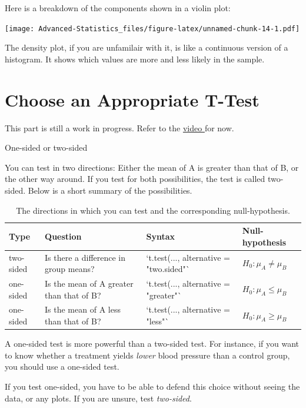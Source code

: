 \documentclass[
]{book}
\begin{document}
Here is a breakdown of the components shown in a violin plot:

\texttt{[image: Advanced-Statistics\_files/figure-latex/unnamed-chunk-14-1.pdf]}

The density plot, if you are unfamilair with it, is like a continuous version of a histogram. It shows which values are more and less likely in the sample.

\hypertarget{choose-an-appropriate-t-test}{%
\section{Choose an Appropriate T-Test}\label{choose-an-appropriate-t-test}}

This part is still a work in progress. Refer to the \href{https://youtu.be/qJA3CvFt_pc}{video } for now.

One-sided or two-sided

You can test in two directions: Either the mean of A is greater than that of B, or the other way around. If you test for both possibilities, the test is called two-sided. Below is a short summary of the possibilities.

\begin{table}

\caption{\label{tab:unnamed-chunk-15}The directions in which you can test and the corresponding null-hypothesis.}
\centering
\fontsize{13}{15}\selectfont
\begin{tabular}[t]{l|l|l|l}
\hline
Type & Question & Syntax & Null-hypothesis\\
\hline
two-sided & Is there a difference in group means? & `t.test(..., alternative = "two.sided"` & $H_0: \mu_A \neq \mu_B$\\
\hline
one-sided & Is the mean of A greater than that of B? & `t.test(..., alternative = "greater"` & $H_0: \mu_A \leq \mu_B$\\
\hline
one-sided & Is the mean of A less than that of B? & `t.test(..., alternative = "less"` & $H_0: \mu_A \geq \mu_B$\\
\hline
\end{tabular}
\end{table}

A one-sided test is more powerful than a two-sided test. For instance, if you want to know whether a treatment yields \emph{lower} blood pressure than a control group, you should use a one-sided test.

If you test one-sided, you have to be able to defend this choice without seeing the data, or any plots. If you are unsure, test \emph{two-sided}.
\end{document}
